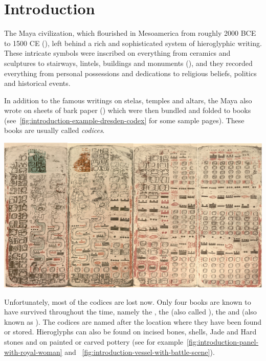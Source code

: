 \documentclass[../main.tex]{subfiles}
\begin{document}
\chapter{Introduction}
The Maya civilization, which flourished in Mesoamerica from roughly 2000 BCE to 1500 CE 
(\cite[3]{estrada-belli2011}), 
left behind a rich and sophisticated system of hieroglyphic writing. 
These intricate symbols were inscribed on everything from ceramics and sculptures to stairways,
lintels, buildings and monuments (\cite[\ppno~17--27]{thompson1962}), and they recorded everything 
from personal possessions and dedications to religious beliefs, politics and historical events.

In addition to the famous writings on stelas, temples and altars, the Maya also wrote on sheets of 
bark paper (\cite[34\psq]{vonhagen1944}) which were then bundled and 
folded to books (see~\ref{fig:introduction-example-dresden-codex} for some sample pages).
These books are usually called \emph{codices}.
\begin{center}
    \includegraphics[width=\textwidth,keepaspectratio]{img/example-dresden-codex}
    \label{fig:introduction-example-dresden-codex}
\end{center}
Unfortunately, most of the codices are lost now.
Only four books are known to have survived throughout the time, 
namely the \dresdencodex, the \madridcodex (also called \troanocodex),
the \pariscodex and \mayamexicocodex(also known as \groliercodex).
The codices are named after the location where they have been found or stored.
Hieroglyphs can also be found on incised bones, shells, Jade and Hard stones and on painted or 
carved pottery (see for example~\ref{fig:introduction-panel-with-royal-woman} and
~\ref{fig:introduction-vessel-with-battle-scene}).
\end{document}
